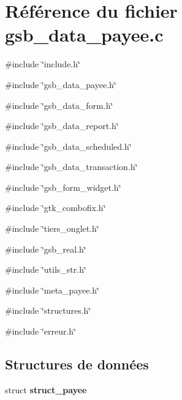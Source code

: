 \section{Référence du fichier gsb\_\-data\_\-payee.c}
\label{gsb__data__payee_8c}
{\ttfamily \#include \char`\"{}include.h\char`\"{}}\par
{\ttfamily \#include \char`\"{}gsb\_\-data\_\-payee.h\char`\"{}}\par
{\ttfamily \#include \char`\"{}gsb\_\-data\_\-form.h\char`\"{}}\par
{\ttfamily \#include \char`\"{}gsb\_\-data\_\-report.h\char`\"{}}\par
{\ttfamily \#include \char`\"{}gsb\_\-data\_\-scheduled.h\char`\"{}}\par
{\ttfamily \#include \char`\"{}gsb\_\-data\_\-transaction.h\char`\"{}}\par
{\ttfamily \#include \char`\"{}gsb\_\-form\_\-widget.h\char`\"{}}\par
{\ttfamily \#include \char`\"{}gtk\_\-combofix.h\char`\"{}}\par
{\ttfamily \#include \char`\"{}tiers\_\-onglet.h\char`\"{}}\par
{\ttfamily \#include \char`\"{}gsb\_\-real.h\char`\"{}}\par
{\ttfamily \#include \char`\"{}utils\_\-str.h\char`\"{}}\par
{\ttfamily \#include \char`\"{}meta\_\-payee.h\char`\"{}}\par
{\ttfamily \#include \char`\"{}structures.h\char`\"{}}\par
{\ttfamily \#include \char`\"{}erreur.h\char`\"{}}\par
\subsection*{Structures de données}
\begin{DoxyCompactItemize}
\item 
struct {\bf struct\_\-payee}
\end{DoxyCompactItemize}

